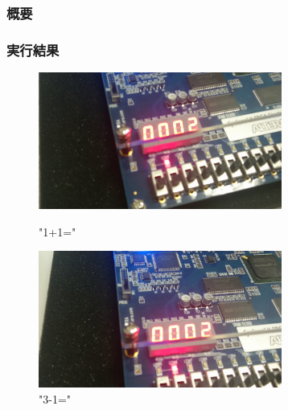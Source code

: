 \documentclass{jsarticle}
\begin{document}
\subsubsection*{概要}

\subsubsection*{実行結果}

\begin{figure}[htbp]
 \begin{minipage}{0.5\hsize}
  \begin{center}
  \includegraphics[width=8cm,bb=0 0 1920 1080]{1+1.png}
  \end{center}
  \caption{"1+1="}
 \end{minipage}
 \begin{minipage}{0.5\hsize}
  \begin{center}
   \includegraphics[width=8cm,bb=0 0 1920 1080]{3-1.png}
  \end{center}
  \caption{"3-1="}
 \end{minipage}
\end{figure}
\end{document}
